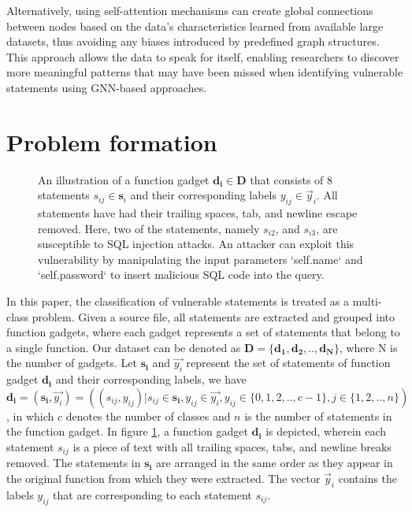 \documentclass{ieeeaccess}
\begin{document}
Alternatively,  using self-attention mechanisms can create global connections between nodes based on the data's characteristics learned from available large datasets, thus avoiding any biases introduced by predefined graph structures. This approach allows the data to speak for itself, enabling researchers to discover more meaningful patterns that may have been missed when identifying vulnerable statements using GNN-based approaches. 
\section{Problem formation}\label{sec:PF}
\begin{figure}[h]
    \centering
    
    \caption{An illustration of a  function gadget $\mathbf{d_i} \in \mathbf{D}$ that consists of 8 statements $s_{ij} \in \mathbf{s}_i$ and their corresponding labels $y_{ij} \in \Vec{y}_i$. All statements have had their trailing spaces, tab, and newline escape removed. Here, two of the statements, namely $s_{i2}$, and $s_{i3}$, are susceptible to SQL injection attacks. An attacker can exploit this vulnerability by manipulating the input parameters `self.name` and `self.password` to insert malicious SQL code into the query.
} \label{fig:func_gadget}
\end{figure}

In this paper, the classification of vulnerable statements is treated as a multi-class problem. Given a source file, all statements are extracted and grouped into function gadgets, where each gadget represents a set of statements that belong to a single function. Our dataset can be denoted as $\mathbf{D=\{\mathbf{d_1, d_2, .., d_N}}\}$, where N is the number of gadgets. Let $\mathbf{s_i}$ and $\vec{y_i}$ represent the set of statements of function gadget $\mathbf{d_i}$ and their corresponding labels, we have  $\mathbf{d_i}=(\mathbf{s_i}, \Vec{y_i})=((s_{ij},y_{ij})|s_{ij}\in \mathbf{s_i}, y_{ij} \in \Vec{y_i}, y_{ij}\in\{0,1,2,.., c-1\}, j \in\{1,2,..,n\})$, in which $c$ denotes the number of classes and $n$ is the number of statements in the function gadget. In figure \ref{fig:func_gadget}, a function gadget $\mathbf{d_i}$ is depicted, wherein each statement $s_{ij}$ is a piece of text with all trailing spaces, tabs, and newline breaks removed. The statements in $\mathbf{s_i}$ are arranged in the same order as they appear in the original function from which they were extracted. The vector $\Vec{y}_i$ contains the labels $y_{ij}$ that are corresponding to each statement $s_{ij}$.
\end{document}

